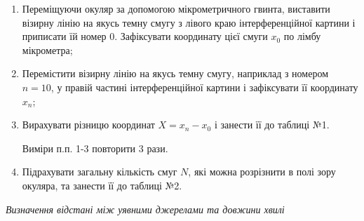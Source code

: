 \documentclass[12pt,a4paper]{article}
\begin{document}
    \begin{enumerate}
        \item Переміщуючи окуляр за допомогою мікрометричного гвинта, виставити візирну
        лінію на якусь темну смугу з лівого краю інтерференційної картини і приписати
        їй номер 0. Зафіксувати координату цієї смуги $x_0$ по лімбу мікрометра;

        \item Перемістити візирну лінію на якусь темну смугу, наприклад з номером
        $n = 10$, у правій частині інтерференційної картини і зафіксувати її координату $x_n$;

        \item Вирахувати різницю координат $X = x_n - x_0$ і занести її до таблиці №1.
        
        Виміри п.п. 1-3 повторити 3 рази.

        \item Підрахувати загальну кількість смуг $N$, які можна розрізнити в полі
        зору окуляра, та занести її до таблиці №2.

    \end{enumerate}

    \begin{center} \textit{Визначення відстані між уявними джерелами та довжини хвилі} \end{center}
\end{document}
